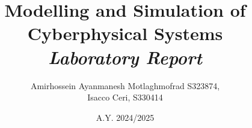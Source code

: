 \documentclass[a4paper, 12pt]{report}
\title{
    \textbf{\Huge{Modelling and Simulation of Cyberphysical Systems}}\\
    \textit{Laboratory Report}
}
\author{Amirhossein Ayanmanesh Motlaghmofrad S323874,\\ Isacco Ceri, S330414 }
\date{A.Y. 2024/2025}
\begin{document}
\maketitle
\tableofcontents










\appendix
\renewcommand{\theequation}{\thesection.\arabic{equation}}

\end{document}
